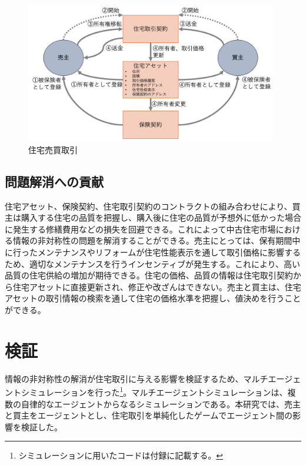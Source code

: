 \documentclass[a4paper,fontsize=11pt,report,notitlepage,line_length=38zw,number_of_lines=40,dvipdfmx]{jlreq}
\begin{document}
\begin{figure}
 \centering
 \includegraphics[width=11cm]{spa.png}
 \caption{住宅売買取引}
 \label{spa}
\end{figure}

\section{問題解消への貢献}
住宅アセット、保険契約、住宅取引契約のコントラクトの組み合わせにより、買主は購入する住宅の品質を把握し、購入後に住宅の品質が予想外に低かった場合に発生する修繕費用などの損失を回避できる。これによって中古住宅市場における情報の非対称性の問題を解消することができる。売主にとっては、保有期間中に行ったメンテナンスやリフォームが住宅性能表示を通して取引価格に影響するため、適切なメンテナンスを行うインセンティブが発生する。これにより、高い品質の住宅供給の増加が期待できる。住宅の価格、品質の情報は住宅取引契約から住宅アセットに直接更新され、修正や改ざんはできない。売主と買主は、住宅アセットの取引情報の検索を通して住宅の価格水準を把握し、値決めを行うことができる。

\chapter{検証}
情報の非対称性の解消が住宅取引に与える影響を検証するため、マルチエージェントシミュレーションを行った\footnote{シミュレーションに用いたコードは付録に記載する。}。マルチエージェントシミュレーションは、複数の自律的なエージェントからなるシミュレーションである。本研究では、売主と買主をエージェントとし、住宅取引を単純化したゲームでエージェント間の影響を検証した。
\end{document}
